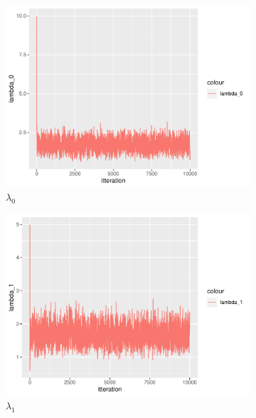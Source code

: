 \begin{figure}
    \centering
    \begin{subfigure}[b]{0.49\textwidth}
        \centering
        \includegraphics[width = \textwidth]{Images/sim_lambda0.pdf}
        \caption{$\lambda_0$}
        \label{fig:burnin_lam0}
    \end{subfigure}
    \begin{subfigure}[b]{0.49\textwidth}
        \centering
        \includegraphics[width = \textwidth]{Images/sim_lambda1.pdf}
        \caption{$\lambda_1$}
        \label{fig:burnin_lam1}
    \end{subfigure}
    \begin{subfigure}[b]{0.49\textwidth}
        \centering

\end{subfigure}
\end{figure}
